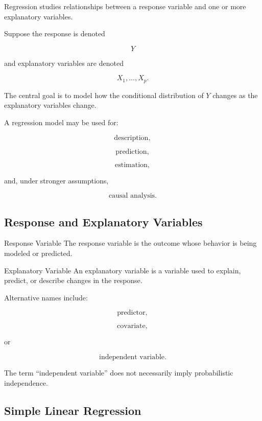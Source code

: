 Regression studies relationships between a response variable and one or
more explanatory variables.

Suppose the response is denoted

\[
Y
\]

and explanatory variables are denoted

\[
X_1,\ldots,X_p.
\]

The central goal is to model how the conditional distribution of \(Y\)
changes as the explanatory variables change.

A regression model may be used for:

\[
\boxed{
\text{description},
}
\]

\[
\boxed{
\text{prediction},
}
\]

\[
\boxed{
\text{estimation},
}
\]

and, under stronger assumptions,

\[
\boxed{
\text{causal analysis}.
}
\]

\subsection{Response and Explanatory Variables}
\label{subsec:response-explanatory-regression}

\begin{definitionbox}{Response Variable}
The response variable is the outcome whose behavior is being modeled or
predicted.
\end{definitionbox}

\begin{definitionbox}{Explanatory Variable}
An explanatory variable is a variable used to explain, predict, or
describe changes in the response.
\end{definitionbox}

Alternative names include:

\[
\boxed{
\text{predictor},
}
\]

\[
\boxed{
\text{covariate},
}
\]

or

\[
\boxed{
\text{independent variable}.
}
\]

The term ``independent variable'' does not necessarily imply
probabilistic independence.

\subsection{Simple Linear Regression}
\label{subsec:simple-linear-regression}

